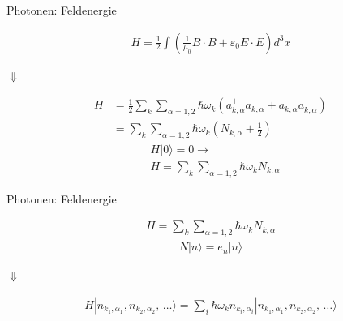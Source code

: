 \documentclass{beamer}
\begin{document}
\begin{frame}[t]{Photonen: Feldenergie}
	\vspace*{-0.5cm}
	\begin{center}
		
		\begin{minipage}{0.35\textwidth}
			\begin{align*}
			H = \frac{1}{2} \int \left(\frac{1}{\mu_0} B \cdot B + \varepsilon_0 E \cdot E \right) d^3 x
			\end{align*}
		\end{minipage}
		
		\vspace*{0.5cm}
		$\Downarrow$
		
		\begin{minipage}{0.35\textwidth}
			\begin{align*}
			H &= \frac{1}{2} \sum_k \sum_{\alpha=1,2} \hbar \omega_k \left(a^+_{k,\alpha} a_{k,\alpha} + a_{k,\alpha} a^+_{k,\alpha}\right) \\
			&= \sum_k \sum_{\alpha=1,2} \hbar \omega_k \left(N_{k,\alpha} + \frac{1}{2} \right)
			\end{align*}
			\vspace*{-0.5cm}
			\begin{align*}
			& H|0\rangle = 0 \rightarrow \\
			& H = \sum_k \sum_{\alpha=1,2} \hbar \omega_k N_{k,\alpha}
			\end{align*}
		\end{minipage}
		
	\end{center}
\end{frame}

\begin{frame}[t]{Photonen: Feldenergie}
	\vspace*{-0.5cm}
	\begin{center}
		\begin{minipage}{0.35\textwidth}
			\begin{align*}
				H = \sum_k \sum_{\alpha=1,2} \hbar \omega_k N_{k,\alpha}
			\end{align*}
			\begin{align*}
				N|n\rangle = e_n|n\rangle
			\end{align*}
		\end{minipage}
		
		\vspace*{0.5cm}
		$\Downarrow$
		
		\begin{minipage}{0.35\textwidth}
			\begin{align*}
				H |n_{k_1,\alpha_1}, n_{k_2,\alpha_2}, \, \hdots\rangle = \sum_i \hbar \omega_k n_{k_i,\alpha_i} |n_{k_1,\alpha_1}, n_{k_2,\alpha_2}, \, \hdots\rangle
			\end{align*}
		\end{minipage}
		
	\end{center}
\end{frame}
\end{document}
